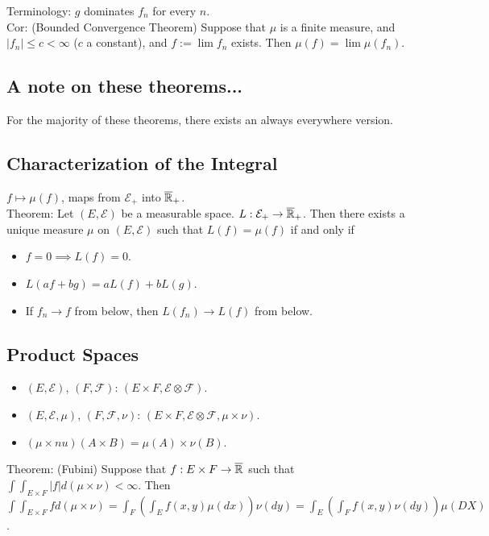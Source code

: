 \documentclass[english, 11pt]{article}
\begin{document}
Terminology: $g$ dominates $f_n$ for every $n$.\\

Cor: (Bounded Convergence Theorem) Suppose that $\mu$ is a finite measure, and $|f_n| \leq c < \infty$ ($c$ a constant), and $f:= \lim f_n$ exists. Then $\mu(f) = \lim \mu(f_n)$.\\

\subsection{A note on these theorems...}
For the majority of these theorems, there exists an always everywhere version.\\


\subsection{Characterization of the Integral}

$f \mapsto \mu(f)$, maps from $\mathcal{E}_+$ into $\overline{{\mathbb{R}}}_+$.\\

Theorem: Let $(E, \mathcal{E})$ be a measurable space. $L: \mathcal{E}_+ \to \overline{{\mathbb{R}}}_+$. Then there exists a unique measure $\mu$ on $(E, \mathcal{E})$ such that $L(f) = \mu(f)$ if and only if

\begin{itemize}
	\item $f = 0 \implies L(f) = 0$.
	\item $L(af + bg) = aL(f) + bL(g)$.
	\item If $f_n \to f$ from below, then $L(f_n) \to L(f)$ from below.
\end{itemize}

\subsection{Product Spaces}

\begin{itemize}
	\item $(E, \mathcal{E})$, $(F, \mathcal{F})$: $(E \times F, \mathcal{E} \otimes \mathcal{F})$.
	\item $(E, \mathcal{E}, \mu)$, $(F, \mathcal{F}, \nu)$: $(E \times F, \mathcal{E} \otimes \mathcal{F}, \mu \times \nu)$.
	\item $(\mu \times nu)(A \times B) = \mu(A) \times \nu(B)$.
\end{itemize}

Theorem: (Fubini) Suppose that $f: E \times F \to \overline{{\mathbb{R}}}$ such that $\int \int_{E \times F} |f| d(\mu \times \nu) < \infty$. Then $\int \int_{E \times F} f d(\mu \times \nu) = \int_F (\int_E f(x, y) \mu(dx)) \nu(dy) = \int_E (\int_F f(x, y) \nu(dy)) \mu(DX)$.\\
\end{document}
